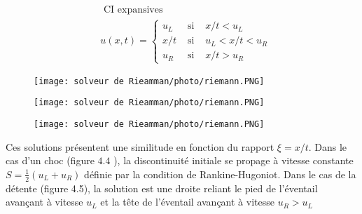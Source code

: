 \begin{equation}
\begin{aligned}
&\text { CI expansives }\\
&u(x, t)=\left\{\begin{array}{ccl}
u_{L} & \text { si } & x / t<u_{L} \\
x / t & \text { si } & u_{L}<x / t<u_{R} \\
u_{R} & \text { si } & x / t>u_{R}
\end{array}\right.
\end{aligned}
\end{equation}
\begin{figure}[H]
\begin{center}
\texttt{[image: solveur de Rieamman/photo/riemann.PNG]}
\caption{}
\end{center}
\end{figure}
\begin{figure}[H]
\begin{center}
        \texttt{[image: solveur de Rieamman/photo/riemann.PNG]}
\caption{}
\end{center}
\end{figure}
\begin{figure}[H]
\begin{center}
        \texttt{[image: solveur de Rieamman/photo/riemann.PNG]}
\caption{}
\end{center}
\end{figure}
Ces solutions présentent une similitude en fonction du rapport $\xi=x / t .$ Dans le cas d'un choc (figure $4.4$ ), la discontinuité initiale se propage à vitesse constante $S=\frac{1}{2}\left(u_{L}+u_{R}\right)$ définie par la condition de Rankine-Hugoniot. Dans le cas de la détente (figure 4.5), la solution est une droite reliant le pied de l'éventail avançant à vitesse $u_{L}$ et la tête de l'éventail avançant à vitesse $u_{R}>u_{L}$




